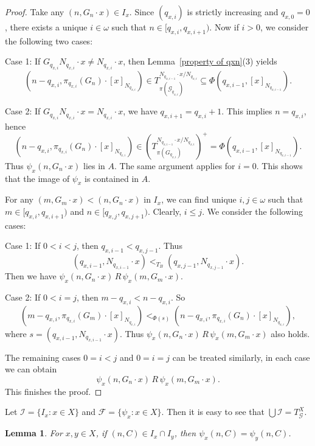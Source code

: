 \documentclass[11pt]{amsart}
\newtheorem{lemma}[theorem]{Lemma}
\theoremstyle{definition}
\theoremstyle{remark}
\numberwithin{equation}{section}
\def\otr#1#2{T_{\mathcal{#1}}^{#2}}
\begin{document}
\begin{proof}
    Take any $(n,G_n\cdot x)\in I_x$. Since $(q_{x,i})$ is strictly increasing and $q_{x,0}=0$, there exists a unique $i\in\omega$ such that $n\in[q_{x,i},q_{x,i+1})$. Now if $i>0$, we consider the following two cases:

    Case 1: If $G_{q_{x,i}}N_{q_{x,i}}\cdot x\ne N_{q_{x,i}}\cdot x$, then Lemma~\ref{property of qxn}(3) yields
    $$(n-q_{x,i},\pi_{q_{x,i}}(G_n)\cdot[x]_{N_{q_{x,i}}})\in T_{\pi(\mathcal{G}_{q_{x,i}})}^{N_{q_{x,i-1}}\cdot x/N_{q_{x,i}}}\subseteq\Phi(q_{x,i-1},[x]_{N_{q_{x,i-1}}}).$$

    Case 2: If $G_{q_{x,i}}N_{q_{x,i}}\cdot x=N_{q_{x,i}}\cdot x$, we have $q_{x,i+1}=q_{x,i}+1$. This implies $n=q_{x,i}$, hence
    $$(n-q_{x,i},\pi_{q_{x,i}}(G_n)\cdot[x]_{N_{q_{x,i}}})\in(T_{\pi(G_{q_{x,i}})}^{N_{q_{x,i-1}}\cdot x/N_{q_{x,i}}})^+=\Phi(q_{x,i-1},[x]_{N_{q_{x,i-1}}}).$$
    Thus $\psi_x(n,G_n\cdot x)$ lies in $A$. The same argument applies for $i=0$. This shows that the image of $\psi_x$ is contained in $A$.

    For any $(m,G_m\cdot x)<(n,G_n\cdot x)$ in $I_x$, we can find unique $i,j\in\omega$ such that $m\in[q_{x,i},q_{x,i+1})$ and $n\in[q_{x,j},q_{x,j+1})$. Clearly, $i\le j$. We consider the following cases:

    Case 1: If $0<i<j$, then $q_{x,i-1}<q_{x,j-1}$. Thus
    $$(q_{x,i-1},N_{q_{x,i-1}}\cdot x)<_{T_B}(q_{x,j-1},N_{q_{x,j-1}}\cdot x).$$
    Then we have $\psi_x(n,G_n\cdot x)\,R\,\psi_x(m,G_m\cdot x)$.

    Case 2: If $0<i=j$, then $m-q_{x,i}<n-q_{x,i}$. So
    $$(m-q_{x,i},\pi_{q_{x,i}}(G_m)\cdot[x]_{N_{q_{x,i}}})<_{\Phi(s)}(n-q_{x,i},\pi_{q_{x,i}}(G_n)\cdot[x]_{N_{q_{x,i}}}),$$
    where $s=(q_{x,i-1},N_{q_{x,i-1}}\cdot x)$. Thus $\psi_x(n,G_n\cdot x)\,R\,\psi_x(m,G_m\cdot x)$ also holds.

    The remaining cases $0=i<j$ and $0=i=j$ can be treated similarly, in each case we can obtain
    $$\psi_x(n,G_n\cdot x)\,R\,\psi_x(m,G_m\cdot x).$$
    This finishes the proof.
\end{proof}

Let $\mathcal{I}=\{I_x:x\in X\}$ and $\mathcal{F}=\{\psi_x:x\in X\}$. Then it is easy to see that $\bigcup\mathcal{I}=\otr{G}{X}$.

\begin{lemma}\label{family of psix are compatible}
For $x,y\in X$, if $(n,C)\in I_x\cap I_y$, then $\psi_x(n,C)=\psi_y(n,C)$.
\end{lemma}
\end{document}
